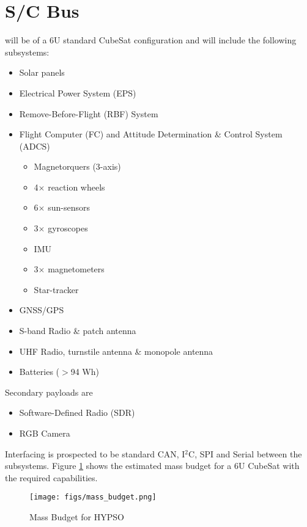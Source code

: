 \section{S/C Bus} \label{sec:bus}
\hypso will be of a 6U standard CubeSat configuration and will include the following subsystems:
\begin{itemize}
\item Solar panels
\item Electrical Power System (EPS)
\item Remove-Before-Flight (RBF) System
\item Flight Computer (FC) and Attitude Determination \& Control System (ADCS)
\begin{itemize}
\item Magnetorquers (3-axis)
\item 4$\times$ reaction wheels
\item 6$\times$ sun-sensors
\item 3$\times$ gyroscopes
\item IMU
\item 3$\times$ magnetometers
\item Star-tracker
\end{itemize}
\item GNSS/GPS
\item S-band Radio \& patch antenna
\item UHF Radio, turnstile antenna \& monopole antenna
\item Batteries ($>$94 Wh)
\end{itemize}
Secondary payloads are
\begin{itemize}
\item Software-Defined Radio (SDR)
\item RGB Camera
\end{itemize}
Interfacing is prospected to be standard CAN, I$^2$C, SPI and Serial between the subsystems. Figure \ref{fig:mass} shows the estimated mass budget for a 6U CubeSat with the required capabilities.
\begin{figure}[htbp]
  \begin{center}
    \texttt{[image: figs/mass\_budget.png]}
    \caption{Mass Budget for HYPSO}
    \label{fig:mass}
  \end{center}
\end{figure}
